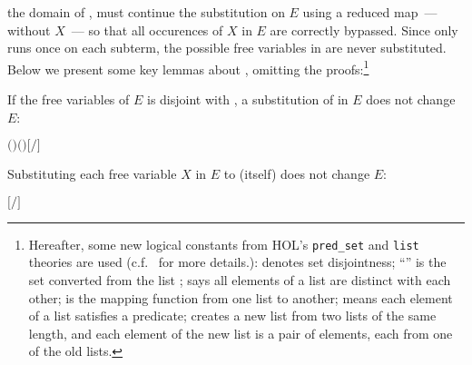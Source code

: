the domain of ,  must continue the
substitution on $E$ using a reduced map~--- without $X$~--- so that all
occurences of $X$ in $E$ are correctly bypassed.
Since  only runs
once on each subterm, the possible free variables in   are never
 substituted. 
Below we present some key lemmas about
, omitting the proofs:\footnote{Hereafter,
  some new logical constants from HOL's \texttt{pred_set}
and \texttt{list} theories are used (c.f.~\cite{holdesc} for more
details.):  denotes set disjointness;
``'' is the set converted from the list ;
 says
all elements of a list are distinct with each other;  is
the mapping function from one list to another;  means
each element of a list satisfies a predicate;  creates a
new list from two lists of the same length, and each element of the new list is a pair of
elements, each from one of the old lists.}

\begin{lemma}
If the free variables of $E$ is disjoint with , a
substitution of  in $E$ does not change $E$:
\begin{alltt}
\HOLTokenTurnstile{}  \ensuremath{(} \ensuremath{)} \ensuremath{(} \ensuremath{)} \HOLSymConst{\HOLTokenConj{}}   \HOLSymConst{\ensuremath{=}}   \HOLSymConst{\HOLTokenImp{}} \ensuremath{[}\ensuremath{/}\ensuremath{]}  \HOLSymConst{\ensuremath{=}} 
\end{alltt}
\end{lemma}

\begin{lemma}
  Substituting each free variable $X$ %
  in $E$ to  (itself) does not change $E$:
\begin{alltt}
\HOLTokenTurnstile{}   \HOLSymConst{\HOLTokenImp{}} \ensuremath{[}  \ensuremath{/}\ensuremath{]}  \HOLSymConst{\ensuremath{=}} 
\end{alltt}
\end{lemma}

